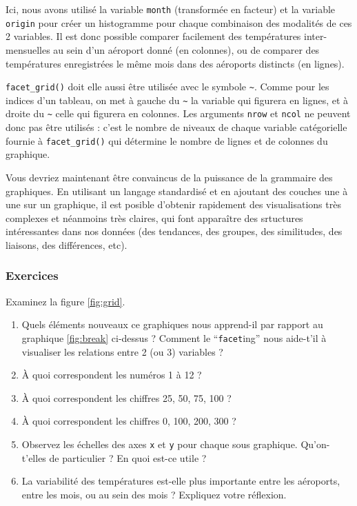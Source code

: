 \documentclass[a4paperpaper,]{article}
\providecommand{\tightlist}{%
  \setlength{\itemsep}{0pt}\setlength{\parskip}{0pt}}
\theoremstyle{definition}
\theoremstyle{definition}
\theoremstyle{definition}
\theoremstyle{remark}
\begin{document}
Ici, nous avons utilisé la variable \texttt{month} (transformée en
facteur) et la variable \texttt{origin} pour créer un histogramme pour
chaque combinaison des modalités de ces 2 variables. Il est donc
possible comparer facilement des températures inter-mensuelles au sein
d'un aéroport donné (en colonnes), ou de comparer des températures
enregistrées le même mois dans des aéroports distincts (en lignes).

\texttt{facet\_grid()} doit elle aussi être utilisée avec le symbole
\texttt{\textasciitilde{}}. Comme pour les indices d'un tableau, on met
à gauche du \texttt{\textasciitilde{}} la variable qui figurera en
lignes, et à droite du \texttt{\textasciitilde{}} celle qui figurera en
colonnes. Les arguments \texttt{nrow} et \texttt{ncol} ne peuvent donc
pas être utilisés : c'est le nombre de niveaux de chaque variable
catégorielle fournie à \texttt{facet\_grid()} qui détermine le nombre de
lignes et de colonnes du graphique.

Vous devriez maintenant être convaincus de la puissance de la grammaire
des graphiques. En utilisant un langage standardisé et en ajoutant des
couches une à une sur un graphique, il est posible d'obtenir rapidement
des visualisations très complexes et néanmoins très claires, qui font
apparaître des srtuctures intéressantes dans nos données (des tendances,
des groupes, des similitudes, des liaisons, des différences, etc).

\hypertarget{exercices-4}{%
\subsubsection{Exercices}\label{exercices-4}}

Examinez la figure \ref{fig:grid}.

\begin{enumerate}
\def\labelenumi{\arabic{enumi}.}
\tightlist
\item
  Quels éléments nouveaux ce graphiques nous apprend-il par rapport au
  graphique \ref{fig:break} ci-dessus ? Comment le ``\texttt{facet}ing''
  nous aide-t'il à visualiser les relations entre 2 (ou 3) variables ?
\item
  À quoi correspondent les numéros 1 à 12 ?
\item
  À quoi correspondent les chiffres 25, 50, 75, 100 ?
\item
  À quoi correspondent les chiffres 0, 100, 200, 300 ?
\item
  Observez les échelles des axes \texttt{x} et \texttt{y} pour chaque
  sous graphique. Qu'on-t'elles de particulier ? En quoi est-ce utile ?
\item
  La variabilité des températures est-elle plus importante entre les
  aéroports, entre les mois, ou au sein des mois ? Expliquez votre
  réflexion.
\end{enumerate}
\end{document}

